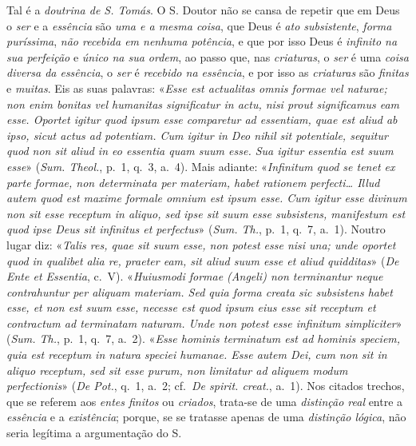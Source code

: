 \documentclass[12pt,a4paper]{article}
\begin{document}
{  Tal é a \emph{doutrina de S. Tomás}. O S. Doutor não se cansa de repetir
  \textemdash{} que em Deus o \emph{ser} e a \emph{essência} são \emph{uma e a
  mesma coisa}, \textemdash{} que Deus é \emph{ato subsistente}, \emph{forma
  puríssima}, \emph{não recebida em nenhuma potência}, \textemdash{} e que por
  isso Deus é \emph{infinito na sua perfeição} e \emph{único na sua ordem}, ao
  passo que, nas \emph{criaturas}, o \emph{ser} é uma \emph{coisa diversa da
  essência}, o \emph{ser} é \emph{recebido na essência}, e por isso as
  \emph{criaturas} são \emph{finitas} e \emph{muitas}. Eis as suas palavras:
  «\textit{Esse est actualitas omnis formae vel naturae; non enim bonitas vel
  humanitas significatur in actu, nisi prout significamus eam esse. Oportet
  igitur quod ipsum esse comparetur ad essentiam, quae est aliud ab ipso, sicut
  actus ad potentiam. Cum igitur in Deo nihil sit potentiale, sequitur quod non
  sit aliud in eo essentia quam suum esse. Sua igitur essentia est suum esse}»
  (\emph{Sum. Theol.}, p.~1, q.~3, a.~4). \textemdash{} Mais adiante:
  «\textit{Infinitum quod se tenet ex parte formae, non determinata per
  materiam, habet rationem perfecti\dots{} Illud autem quod est maxime formale
  omnium est ipsum esse. Cum igitur esse divinum non sit esse receptum in
  aliquo, sed ipse sit suum esse subsistens, manifestum est quod ipse Deus sit
  infinitus et perfectus}» (\emph{Sum. Th.}, p.~1, q.~7, a.~1). \textemdash{}
  Noutro lugar diz: «\textit{Talis res, quae sit suum esse, non potest esse
  nisi una; unde oportet quod in qualibet alia re, praeter eam, sit aliud suum
  esse et aliud quidditas}» (\emph{De Ente et Essentia}, c.~V). \textemdash{}
  «\textit{Huiusmodi formae (Angeli) non terminantur neque contrahuntur per
  aliquam materiam. Sed quia forma creata sic subsistens habet esse, et non est
  suum esse, necesse est quod ipsum eius esse sit receptum et contractum ad
  terminatam naturam. Unde non potest esse infinitum simpliciter}» (\emph{Sum.
  Th.}, p.~1, q.~7, a.~2). \textemdash{} «\textit{Esse hominis terminatum est ad
  hominis speciem, quia est receptum in natura speciei humanae. Esse autem Dei,
  cum non sit in aliquo receptum, sed sit esse purum, non limitatur ad aliquem
  modum perfectionis}» (\emph{De Pot.}, q.~1, a.~2; cf.\ \emph{De spirit.
  creat.}, a.~1). \textemdash{} Nos citados trechos, que se referem aos
  \emph{entes finitos} ou \emph{criados}, trata-se de uma \emph{distinção real}
  entre a \emph{essência} e a \emph{existência}; porque, se se tratasse apenas
  de uma \emph{distinção lógica}, não seria legítima a argumentação do S.
}
\end{document}

